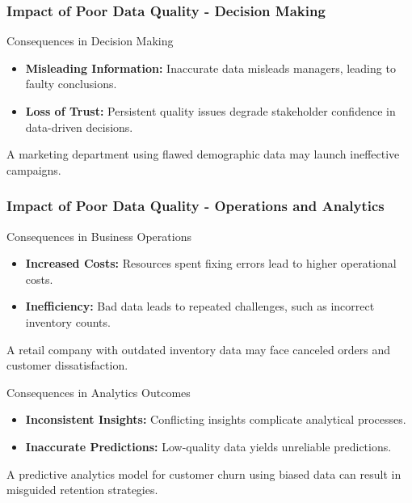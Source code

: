 \documentclass[aspectratio=169]{beamer}
\begin{document}
\begin{frame}[fragile]
    \frametitle{Impact of Poor Data Quality - Decision Making}
    \begin{block}{Consequences in Decision Making}
        \begin{itemize}
            \item \textbf{Misleading Information:} Inaccurate data misleads managers, leading to faulty conclusions.
            \item \textbf{Loss of Trust:} Persistent quality issues degrade stakeholder confidence in data-driven decisions.
        \end{itemize}
        \begin{example}
            A marketing department using flawed demographic data may launch ineffective campaigns.
        \end{example}
    \end{block}
\end{frame}

\begin{frame}[fragile]
    \frametitle{Impact of Poor Data Quality - Operations and Analytics}
    \begin{block}{Consequences in Business Operations}
        \begin{itemize}
            \item \textbf{Increased Costs:} Resources spent fixing errors lead to higher operational costs.
            \item \textbf{Inefficiency:} Bad data leads to repeated challenges, such as incorrect inventory counts.
        \end{itemize}
        \begin{example}
            A retail company with outdated inventory data may face canceled orders and customer dissatisfaction.
        \end{example}
    \end{block}

    \begin{block}{Consequences in Analytics Outcomes}
        \begin{itemize}
            \item \textbf{Inconsistent Insights:} Conflicting insights complicate analytical processes.
            \item \textbf{Inaccurate Predictions:} Low-quality data yields unreliable predictions.
        \end{itemize}
        \begin{example}
            A predictive analytics model for customer churn using biased data can result in misguided retention strategies.
        \end{example}
    \end{block}
\end{frame}
\end{document}
